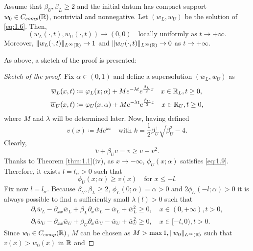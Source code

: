 \begin{theorem}
    Assume that \(\beta_U, \beta_L \geq 2\) and the initial datum has compact support \(w_{0} \in C_{comp}(\mathbb{R})\), nontrivial and nonnegative. Let \((w_L, w_{U})\) be the solution of \eqref{eq:1.6}. Then,
    \[
        (w_L(\cdot, t), w_{U}(\cdot, t)) \to (0, 0) \quad \text{locally uniformly as } t \to +\infty.
    \]
    Moreover, \(\lVert w_L(\cdot, t)\rVert_{L^{\infty}(\mathbb{R})} \to 1\) and \(\lVert w_U(\cdot, t)\rVert_{L^{\infty}(\mathbb{R})} \to 0\) as \(t \to +\infty\).
    \label{thm:3.2}
\end{theorem}
As above, a sketch of the proof is presented:
\begin{proof}[Sketch of the proof]
    Fix \(\alpha \in (0, 1)\) and define a supersolution \((\overline{w}_L, \overline{w}_U)\) as
    \begin{align*}
        \overline{w}_L(x, t) & \coloneqq \varphi_L(x; \alpha) + M e^{-\lambda t} e^{\frac{\beta_L}{2}x} \quad x \in \mathbb{R}_L, t \geq 0, \\
        \overline{w}_U(x, t) & \coloneqq \varphi_U(x; \alpha) + M e^{-\lambda t} e^{\frac{\beta_U}{2}x} \quad x \in \mathbb{R}_U, t \geq 0,
    \end{align*}
    where \(M\) and \(\lambda\) will be determined later. Now, having defined 
    \[
        v(x) \coloneqq M e^{kx} \quad \text{with } k = \frac{1}{2}\beta_U^ + \sqrt{\beta_U^2 - 4}.
    \]
    Clearly,
    \[
        \ddot{v} + \beta_U \dot{v} = v \geq v - v^2.
    \]
    Thanks to Theorem \ref{thm:1.1}(iv), as \(x \to -\infty\), \(\phi_U(x; \alpha)\) satisfies \eqref{eq:1.9}. Therefore, it exists \(l = l_\alpha > 0\) such that
    \[
        \phi_U(x; \alpha) \geq v(x) \quad \text{for } x \leq -l.
    \]
    Fix now \(l = l_\alpha\). Because \(\beta_U, \beta_L \geq 2\), \(\phi_L(0;\alpha) = \alpha > 0\) and \(2\phi_U(-l;\alpha) > 0\) it is always possible to find a sufficiently small \(\lambda(l) > 0\) such that 
    \begin{align*}
        \partial_t \overline{w}_L - \partial_{xx} \overline{w}_L + \beta_L \partial_x \overline{w}_L - \overline{w}_L + \overline{w}_L^2 \geq 0, \quad x \in (0, +\infty), t > 0, \\
        \partial_t \overline{w}_U - \partial_{xx} \overline{w}_U + \beta_U \partial_x \overline{w}_U - \overline{w}_U + \overline{w}_U^2 \geq 0, \quad x \in [-l, 0), t > 0.
    \end{align*}
    Since \(w_0 \in C_{comp}(\mathbb{R})\), \(M\) can be chosen as \(M > \max{1, \lVert w_0\rVert_{L^{\infty}(\mathbb{R})}}\) such that \(v(x) > w_0(x)\) in \(\mathbb{R}\) and 

\end{proof}
